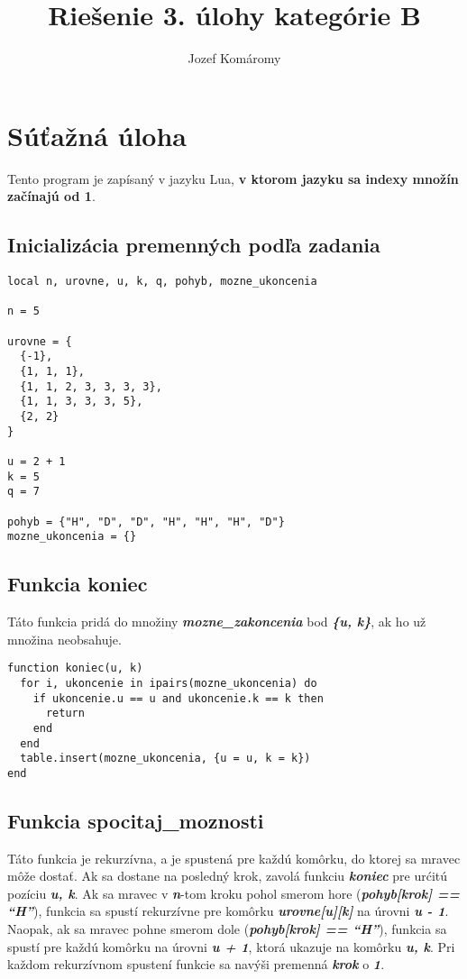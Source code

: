 \documentclass{article}
\begin{document}
\title{Riešenie 3. úlohy kategórie B}
\author{Jozef Komáromy}

\maketitle


\section{Súťažná úloha}

Tento program je zapísaný v jazyku Lua, \textbf{v ktorom jazyku sa indexy množín začínajú od 1}.


\subsection{Inicializácia premenných podľa zadania}

\begin{lstlisting}
local n, urovne, u, k, q, pohyb, mozne_ukoncenia

n = 5

urovne = {
  {-1},
  {1, 1, 1},
  {1, 1, 2, 3, 3, 3, 3},
  {1, 1, 3, 3, 3, 5},
  {2, 2}
}

u = 2 + 1
k = 5
q = 7

pohyb = {"H", "D", "D", "H", "H", "H", "D"}
mozne_ukoncenia = {}
\end{lstlisting}

\subsection{Funkcia koniec}


Táto funkcia pridá do množiny \textbf{\textit{mozne\_zakoncenia}} bod \textbf{\textit{\{u, k\}}}, ak ho už množina neobsahuje.


\begin{lstlisting}
function koniec(u, k)
  for i, ukoncenie in ipairs(mozne_ukoncenia) do
    if ukoncenie.u == u and ukoncenie.k == k then
      return
    end
  end
  table.insert(mozne_ukoncenia, {u = u, k = k})
end
\end{lstlisting}

\subsection{Funkcia spocitaj\_moznosti}

Táto funkcia je rekurzívna, a je spustená pre každú komôrku, do ktorej sa mravec môže dostať. Ak sa dostane na posledný krok, zavolá funkciu \textbf{\textit{koniec}} pre urćitú pozíciu \textbf{\textit{u, k}}.
Ak sa mravec v \textbf{\textit{n}}-tom kroku pohol smerom hore (\textbf{\textit{pohyb[krok] == ``H''}}), funkcia sa spustí rekurzívne pre komôrku \textbf{\textit{urovne[u][k]}} na úrovni \textbf{\textit{u - 1}}.
Naopak, ak sa mravec pohne smerom dole (\textbf{\textit{pohyb[krok] == ``H''}}), funkcia sa spustí pre každú komôrku na úrovni \textbf{\textit{u + 1}}, ktorá ukazuje na komôrku \textbf{\textit{u, k}}.
Pri každom rekurzívnom spustení funkcie sa navýši premenná \textbf{\textit{krok}} o \textbf{\textit{1}}.
\end{document}
